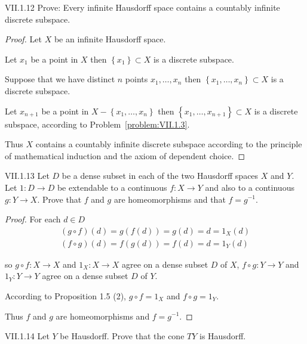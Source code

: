 \begin{problem}{VII.1.12}
Prove: Every infinite Hausdorff space contains a countably infinite discrete subspace.
\end{problem}

\begin{proof}
	Let \( X \) be an infinite Hausdorff space.

	Let \( x_{1} \) be a point in \( X \) then \( \left\{ x_{1} \right\} \subset X \) is a discrete subspace.

	Suppose that we have distinct \( n \) points \( x_{1}, \ldots, x_{n} \) then \( \left\{ x_{1}, \ldots, x_{n} \right\} \subset X \) is a discrete subspace.

	Let \( x_{n+1} \) be a point in \( X - \left\{ x_{1}, \ldots, x_{n} \right\} \) then \( \left\{ x_{1}, \ldots, x_{n+1} \right\} \subset X \) is a discrete subspace, according to Problem~\ref{problem:VII.1.3}.

	Thus \( X \) contains a countably infinite discrete subspace according to the principle of mathematical induction and the axiom of dependent choice.
\end{proof}

\begin{problem}{VII.1.13}
Let \( D \) be a dense subset in each of the two Hausdorff spaces \(X\) and \(Y\). Let \( 1: D \to D \) be extendable to a continuous \( f: X \to Y \) and also to a continuous \( g: Y \to X \). Prove that \( f \) and \( g \) are homeomorphisms and that \( f = g^{-1} \).
\end{problem}

\begin{proof}
	For each \( d \in D \)
	\[
		\begin{split}
			(g \circ f)(d) = g(f(d)) = g(d) = d = 1_{X}(d) \\
			(f \circ g)(d) = f(g(d)) = f(d) = d = 1_{Y}(d)
		\end{split}
	\]

	so \( g \circ f: X \to X \) and \( 1_{X}: X \to X \) agree on a dense subset \( D \) of \( X \), \( f \circ g: Y \to Y \) and \( 1_{Y}: Y \to Y \) agree on a dense subset \( D \) of \( Y \).

	According to Proposition 1.5 (2), \( g \circ f = 1_{X} \) and \( f \circ g = 1_{Y} \).

	Thus \( f \) and \( g \) are homeomorphisms and \( f = g^{-1} \).
\end{proof}

\begin{problem}{VII.1.14}
Let \( Y \) be Hausdorff. Prove that the cone \( TY \) is Hausdorff.
\end{problem}

